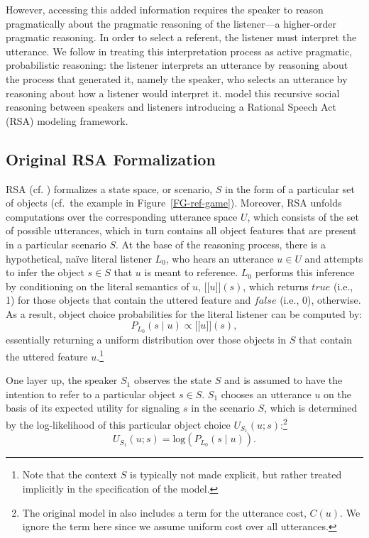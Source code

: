 \documentclass[11pt,a4paper]{article}
\newcommand{\sem}[1]{\mbox{$[\![$#1$]\!]$}}
\begin{document}
However, accessing this added information requires the speaker to reason pragmatically about the pragmatic reasoning of the listener---a higher-order pragmatic reasoning.
In order to select a referent, the listener must interpret the utterance. We follow  in treating this interpretation process as active pragmatic, probabilistic reasoning: the listener interprets an utterance by reasoning about the process that generated it, namely the speaker, who selects an utterance by reasoning about how a listener would interpret it. \citeauthor{frankgoodman2012} model this recursive social reasoning between speakers and listeners introducing a Rational Speech Act (RSA) modeling framework.

\subsection{Original RSA Formalization}
RSA (cf. ) formalizes a state space, or scenario, $S$ in the form of a particular set of objects (cf.~the example in Figure~\ref{FG-ref-game}). 
Moreover, RSA unfolds computations over the corresponding utterance space $U$, which consists of the set of possible utterances, which in turn contains all object features that are present in a particular scenario $S$.
At the base of the reasoning process, there is a hypothetical, na\"ive literal listener $L_0$, who hears an utterance $u\in U$ and attempts to infer the object $s \in S$ that $u$ is meant to reference. 
$L_0$ performs this inference by conditioning on the literal semantics of $u$, \sem{$u$}$(s)$, which returns $true$ (i.e., 1) for those objects that contain the uttered feature and $false$ (i.e., 0), otherwise.
As a result, object choice probabilities for the literal listener can be computed by: 
\begin{equation}
P_{L_{0}}(s\mid u) \propto \sem{$u$}(s),
\end{equation}
essentially returning a uniform distribution over those objects in $S$ that contain the uttered feature $u$.\footnote{Note that the context $S$ is typically not made explicit, but rather treated implicitly in the specification of the model.}


One layer up, the speaker $S_1$ observes the state $S$ and is assumed to have the intention to refer to a particular object $s \in S$.
$S_1$ chooses an utterance $u$ on the basis of its expected utility for signaling $s$ in the scenario $S$, which is determined by the log-likelihood of this particular object choice $U_{S_1}(u;s)$:\footnote{The original model in  also includes a term for the utterance cost, $C(u)$. We ignore the term here since we assume uniform cost over all utterances.}
\begin{equation}
U_{S_{1}}(u;s) = \textrm{log}(P_{L_{0}}(s \mid u)).
\end{equation}
\end{document}
